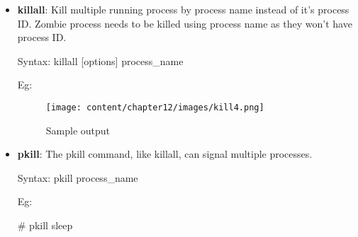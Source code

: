 \begin{flushleft}
\begin{itemize}
\begin{itemize}
\begin{itemize}
		
			\end{itemize}
		

					
		\end{itemize}
	
	\newpage
	\item \textbf{killall}: Kill multiple running process by process name instead of it's process ID. Zombie process needs to be killed using process name as they won't have process ID.
	\bigskip
	\begin{tcolorbox}[breakable,notitle,boxrule=-0pt,colback=pink,colframe=pink]
		\color{black}
		\font=9pt
		Syntax: killall [options] process\_name
		\font=4pt
	\end{tcolorbox}
	Eg:
	\begin{figure}[h!]
		\centering
		\texttt{[image: content/chapter12/images/kill4.png]}
		\caption{Sample output}
		\label{fig:top_command_output5}
	\end{figure}

	\item \textbf{pkill}: The pkill command, like killall, can signal multiple processes.
	\bigskip
	\begin{tcolorbox}[breakable,notitle,boxrule=-0pt,colback=pink,colframe=pink]
		\color{black}
		\font=9pt
		Syntax: pkill process\_name
		\font=4pt
	\end{tcolorbox}
	Eg:
	\begin{tcolorbox}[breakable,notitle,boxrule=-0pt,colback=black,colframe=black]
		\color{green}
		\font=9pt
		\# pkill sleep
		\font=4pt
	\end{tcolorbox}

		
	\end{itemize}

\end{flushleft}

\newpage


